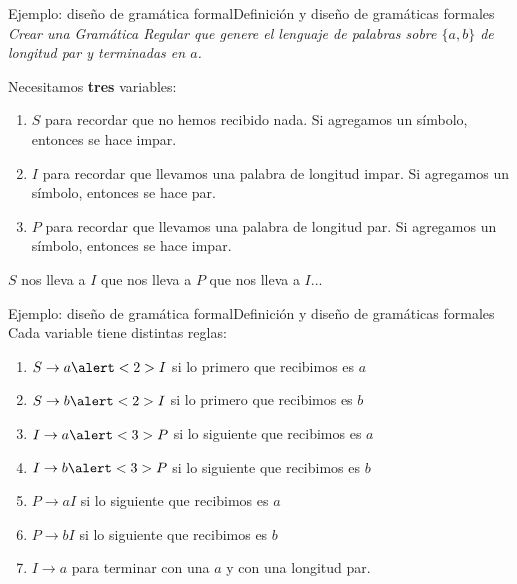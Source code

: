 \documentclass[spanish, handout]{beamer}
\begin{document}
\begin{frame}{Ejemplo: diseño de gramática formal}{Definición y diseño de gramáticas formales}
    {\large \textit{Crear una Gramática Regular que genere el lenguaje de palabras sobre $\{a,b\}$ de longitud par y terminadas en $a$.}} \pause

    \bigskip

    Necesitamos \textbf{tres} variables: \pause

    \begin{enumerate}
        \item $S$ para recordar que no hemos recibido nada. Si agregamos un símbolo, entonces se hace impar. \pause
        \item $I$ para recordar que llevamos una palabra de longitud impar. Si agregamos un símbolo, entonces se hace par. \pause
        \item $P$ para recordar que llevamos una palabra de longitud par. Si agregamos un símbolo, entonces se hace impar.
    \end{enumerate} \pause

    $S$ nos lleva a $I$ que nos lleva a $P$ que nos lleva a $I$...
    
\end{frame}

\begin{frame}{Ejemplo: diseño de gramática formal}{Definición y diseño de gramáticas formales}
    Cada variable tiene distintas reglas: \pause

    \bigskip


    \begin{enumerate}
        \itemsep1.5ex
        \item<2-> $S \to a\alert<2>{I}$ si lo primero que recibimos es $a$
        \item<2-> $S \to b\alert<2>{I}$ si lo primero que recibimos es $b$
        \item<3-> $I \to a\alert<3>{P}$ si lo siguiente que recibimos es $a$
        \item<3-> $I \to b\alert<3>{P}$ si lo siguiente que recibimos es $b$
        \item<4-> $P \to aI$ si lo siguiente que recibimos es $a$ \pause
        \item<4-> $P \to bI$ si lo siguiente que recibimos es $b$ \pause
        \item<4-> $I \to a$ para terminar con una $a$ y con una longitud par.
    \end{enumerate}
    
\end{frame}


% 
% 
\end{document}
